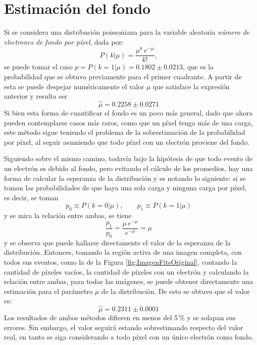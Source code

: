 \section{Estimación del fondo}
\noindent Si se considera una distribución poissoniana para la variable aleatoria \textit{número de electrones de fondo por píxel}, dada por:
\begin{equation*}
    P(k|\mu) = \frac{\mu^{k}\,e^{-\mu}}{k!},
\end{equation*}
se puede tomar el caso $p = P(k = 1 | \mu) = 0.1802 \pm 0.0213$, que es la probabilidad que se obtuvo previamente para el primer cuadrante. A partir de esta se puede despejar numéricamente el valor $\mu$ que satisface la expresión anterior y resulta ser
\begin{equation*}
    \hat{\mu} = 0.2258 \pm 0.0271
\end{equation*}
Si bien esta forma de cuantificar el fondo es un poco más general, dado que ahora pueden contemplarse casos más raros, como que un píxel tenga más de una carga, este método sigue teniendo el problema de la sobrestimación de la probabilidad por píxel, al seguir asumiendo que todo píxel con un electrón proviene del fondo.

Siguiendo sobre el mismo camino, todavía bajo la hipótesis de que todo evento de un electrón es debido al fondo, pero evitando el cálculo de los promedios, hay una forma de calcular la esperanza de la distribución y es notando lo siguiente: si se toman las probabilidades de que haya una sola carga y ninguna carga por píxel, es decir, se toman
\begin{equation*}
    p_{0} \equiv P(k = 0 | \mu),
    \quad
    \quad
    p_{1} \equiv P(k = 1 | \mu)
\end{equation*}
y se mira la relación entre ambas, se tiene
\begin{equation*}
    \frac{p_{1}}{p_{0}} = \frac{\mu\,e^{-\mu}}{e^{-\mu}} = \mu
\end{equation*}
y se observa que puede hallarse directamente el valor de la esperanza de la distribución. Entonces, tomando la región activa de una imagen completa, con todos sus eventos, como la de la Figura \ref{fig:ImagenFitsOriginal}, contando la cantidad de píxeles vacíos, la cantidad de píxeles con un electrón y calculando la relación entre ambas, para todas las imágenes, se puede obtener directamente una estimación para el parámetro $\mu$ de la distribución. De esto se obtuvo que el valor es:
\begin{equation*}
    \hat{\mu} = 0.2311 \pm 0.0001
\end{equation*}
Los resultados de ambos métodos difieren en menos del $5\,\%$ y se solapan sus errores. 
Sin embargo, el valor seguirá estando sobrestimando respecto del valor real, en tanto se siga considerando a todo píxel con un único electrón como fondo.

